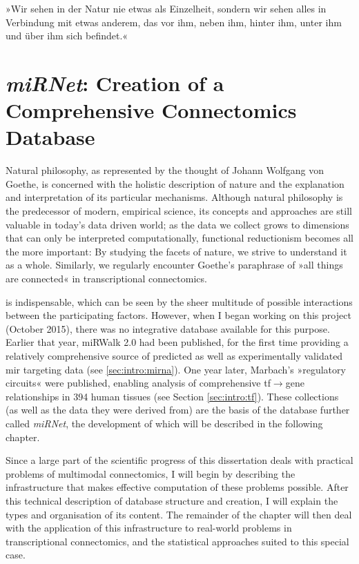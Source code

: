 \begin{savequote}[75mm]
»Wir sehen in der Natur nie etwas als Einzelheit, sondern wir sehen alles in Verbindung mit etwas anderem, das vor ihm, neben ihm, hinter ihm, unter ihm und über ihm sich befindet.«
\end{savequote}

\chapter[miRNet: Creation of a Comprehensive Connectomics Database]{\textit{miRNet}: Creation of a\\Comprehensive Connectomics Database} \label{sec:database:mirnet}
Natural philosophy, as represented by the thought of Johann Wolfgang von Goethe, is concerned with the holistic description of nature and the explanation and interpretation of its particular mechanisms. Although natural philosophy is the predecessor of modern, empirical science, its concepts and approaches are still valuable in today's data driven world; as the data we collect grows to dimensions that can only be interpreted computationally, functional reductionism becomes all the more important: By studying the facets of nature, we strive to understand it as a whole. Similarly, we regularly encounter Goethe's paraphrase of »all things are connected« in transcriptional connectomics.

 is indispensable, which can be seen by the sheer multitude of possible interactions between the participating factors. However, when I began working on this project (October 2015), there was no integrative database available for this purpose. Earlier that year, miRWalk 2.0 had been published, for the first time providing a relatively comprehensive source of predicted as well as experimentally validated \ac{mir} targeting data\cite{Dweep2015} (see \ref{sec:intro:mirna}). One year later, Marbach's »regulatory circuits« were published\cite{Marbach2016}, enabling analysis of comprehensive \ac{tf}$\to$gene relationships in 394 human tissues (see Section \ref{sec:intro:tf}). These collections (as well as the data they were derived from) are the basis of the database further called \textit{miRNet}, the development of which will be described in the following chapter.

Since a large part of the scientific progress of this dissertation deals with practical problems of multimodal connectomics, I will begin by describing the infrastructure that makes effective computation of these problems possible. After this technical description of database structure and creation, I will explain the types and organisation of its content. The remainder of the chapter will then deal with the application of this infrastructure to real-world problems in transcriptional connectomics, and the statistical approaches suited to this special case.

